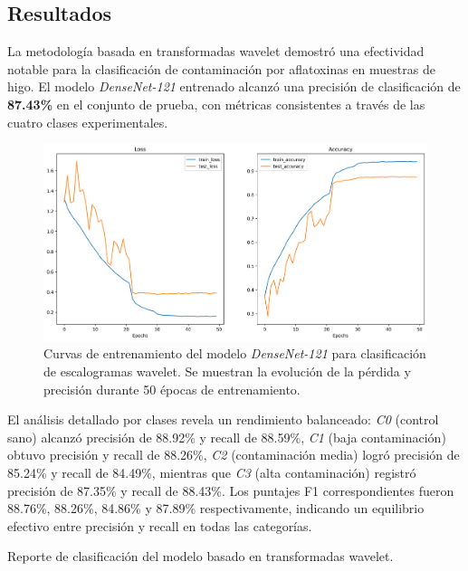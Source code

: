 \subsection{Resultados}

La metodología basada en transformadas wavelet demostró una efectividad notable para la clasificación de contaminación por aflatoxinas en muestras de higo. El modelo \emph{DenseNet-121} entrenado alcanzó una precisión de clasificación de \textbf{87.43\%} en el conjunto de prueba, con métricas consistentes a través de las cuatro clases experimentales.

\begin{figure}[ht]
\centering
\includegraphics[width=\textwidth]{images/wavelet_training_results.png}
\caption{Curvas de entrenamiento del modelo \emph{DenseNet-121} para clasificación de escalogramas wavelet. Se muestran la evolución de la pérdida y precisión durante 50 épocas de entrenamiento.}
\label{fig:wavelet_training_results}
\end{figure}

\vspace{5mm}

El análisis detallado por clases revela un rendimiento balanceado: \emph{C0} (control sano) alcanzó precisión de 88.92\% y recall de 88.59\%, \emph{C1} (baja contaminación) obtuvo precisión y recall de 88.26\%, \emph{C2} (contaminación media) logró precisión de 85.24\% y recall de 84.49\%, mientras que \emph{C3} (alta contaminación) registró precisión de 87.35\% y recall de 88.43\%. Los puntajes F1 correspondientes fueron 88.76\%, 88.26\%, 84.86\% y 87.89\% respectivamente, indicando un equilibrio efectivo entre precisión y recall en todas las categorías.

\begin{table}[ht]
\centering
\caption{Reporte de clasificación del modelo basado en transformadas wavelet.}
\label{tab:wavelet_report}
\end{table}

